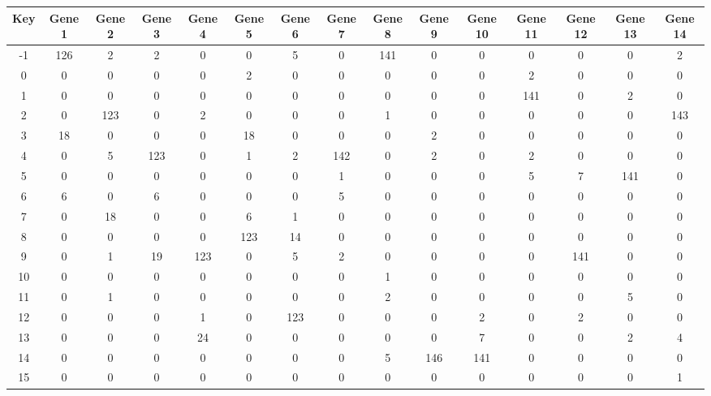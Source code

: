 \begin{tabular}{|c|c|c|c|c|c|c|c|c|c|c|c|c|c|c|}
\hline
Key & Gene 1 & Gene 2 & Gene 3 & Gene 4 & Gene 5 & Gene 6 & Gene 7 & Gene 8 & Gene 9 & Gene 10 & Gene 11 & Gene 12 & Gene 13 & Gene 14 \\
\hline
-1 & 126 & 2 & 2 & 0 & 0 & 5 & 0 & 141 & 0 & 0 & 0 & 0 & 0 & 2 \\
0 & 0 & 0 & 0 & 0 & 2 & 0 & 0 & 0 & 0 & 0 & 2 & 0 & 0 & 0 \\
1 & 0 & 0 & 0 & 0 & 0 & 0 & 0 & 0 & 0 & 0 & 141 & 0 & 2 & 0 \\
2 & 0 & 123 & 0 & 2 & 0 & 0 & 0 & 1 & 0 & 0 & 0 & 0 & 0 & 143 \\
3 & 18 & 0 & 0 & 0 & 18 & 0 & 0 & 0 & 2 & 0 & 0 & 0 & 0 & 0 \\
4 & 0 & 5 & 123 & 0 & 1 & 2 & 142 & 0 & 2 & 0 & 2 & 0 & 0 & 0 \\
5 & 0 & 0 & 0 & 0 & 0 & 0 & 1 & 0 & 0 & 0 & 5 & 7 & 141 & 0 \\
6 & 6 & 0 & 6 & 0 & 0 & 0 & 5 & 0 & 0 & 0 & 0 & 0 & 0 & 0 \\
7 & 0 & 18 & 0 & 0 & 6 & 1 & 0 & 0 & 0 & 0 & 0 & 0 & 0 & 0 \\
8 & 0 & 0 & 0 & 0 & 123 & 14 & 0 & 0 & 0 & 0 & 0 & 0 & 0 & 0 \\
9 & 0 & 1 & 19 & 123 & 0 & 5 & 2 & 0 & 0 & 0 & 0 & 141 & 0 & 0 \\
10 & 0 & 0 & 0 & 0 & 0 & 0 & 0 & 1 & 0 & 0 & 0 & 0 & 0 & 0 \\
11 & 0 & 1 & 0 & 0 & 0 & 0 & 0 & 2 & 0 & 0 & 0 & 0 & 5 & 0 \\
12 & 0 & 0 & 0 & 1 & 0 & 123 & 0 & 0 & 0 & 2 & 0 & 2 & 0 & 0 \\
13 & 0 & 0 & 0 & 24 & 0 & 0 & 0 & 0 & 0 & 7 & 0 & 0 & 2 & 4 \\
14 & 0 & 0 & 0 & 0 & 0 & 0 & 0 & 5 & 146 & 141 & 0 & 0 & 0 & 0 \\
15 & 0 & 0 & 0 & 0 & 0 & 0 & 0 & 0 & 0 & 0 & 0 & 0 & 0 & 1 \\
\hline
\end{tabular}